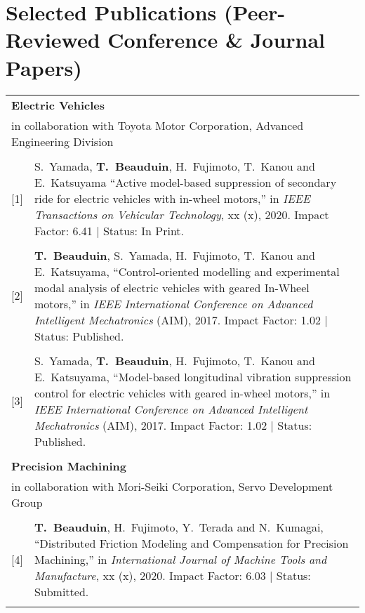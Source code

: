 \documentclass[a4paper,10pt]{article}
\begin{document}
\section{Selected Publications (Peer-Reviewed Conference \& Journal Papers)}
\begin{tabularx}{\textwidth}{cX}

\multicolumn{2}{l}{\textbf{Electric Vehicles}} \\
\multicolumn{2}{l}{in collaboration with Toyota Motor Corporation, Advanced Engineering Division} \\
& \\
	
[1] & S.~Yamada, \textbf{T.~Beauduin}, H.~Fujimoto, T.~Kanou and E.~Katsuyama ``{Active model-based 
	suppression of secondary ride for electric vehicles with in-wheel motors},''
	in \emph{IEEE Transactions on Vehicular Technology}, xx (x), 2020. 
	Impact Factor: 6.41 | Status: In Print. \\
	& \\
	
[2] & \textbf{T.~Beauduin}, S.~Yamada, H.~Fujimoto, T.~Kanou and E.~Katsuyama, ``{Control-oriented modelling 
	and experimental modal analysis of electric vehicles with geared In-Wheel motors},'' in \emph{IEEE 
	International Conference on Advanced Intelligent Mechatronics} (AIM), 2017.
	Impact Factor: 1.02 | Status: Published. \\
& \\
	
[3] & S.~Yamada, \textbf{T.~Beauduin}, H.~Fujimoto, T.~Kanou and E.~Katsuyama, ``{Model-based 
	longitudinal vibration suppression control for electric vehicles with geared in-wheel motors},'' 
	in \emph{IEEE International Conference on Advanced Intelligent Mechatronics} (AIM), 2017.
	Impact Factor: 1.02 | Status: Published. \\
& \\

\multicolumn{2}{l}{\textbf{Precision Machining}} \\
\multicolumn{2}{l}{in collaboration with Mori-Seiki Corporation, Servo Development Group} \\
& \\

[4] & \textbf{T.~Beauduin}, H.~Fujimoto, Y.~Terada and N.~Kumagai, ``{Distributed Friction Modeling and 
	Compensation for Precision Machining},'' in \emph{International Journal of Machine Tools and 
	Manufacture}, xx (x), 2020.
	Impact Factor: 6.03 | Status: Submitted. \\
& \\


\end{tabularx}
\end{document}
